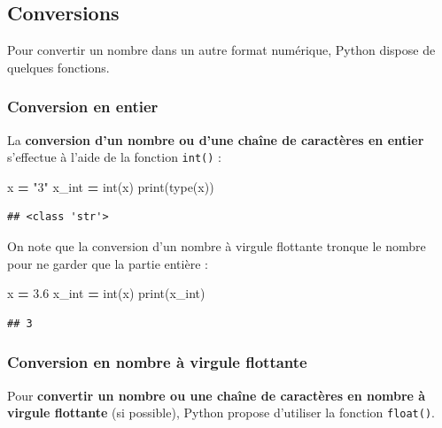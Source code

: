 \documentclass[12pt,]{book}
\newenvironment{Shaded}{\begin{snugshade}}{\end{snugshade}}
\newcommand{\FloatTok}[1]{\textcolor[rgb]{0.00,0.00,0.81}{#1}}
\newcommand{\StringTok}[1]{\textcolor[rgb]{0.31,0.60,0.02}{#1}}
\newcommand{\OperatorTok}[1]{\textcolor[rgb]{0.81,0.36,0.00}{\textbf{#1}}}
\newcommand{\BuiltInTok}[1]{#1}
\newcommand{\NormalTok}[1]{#1}
\numberwithin{equation}{section}
\numberwithin{countremarque}{section}
\begin{document}
\subsection{Conversions}\label{conversions}

Pour convertir un nombre dans un autre format numérique, Python dispose
de quelques fonctions.

\subsubsection{Conversion en entier}\label{conversion-en-entier}

La \textbf{conversion d'un nombre ou d'une chaîne de caractères en
entier} s'effectue à l'aide de la fonction \texttt{int()} :

\begin{Shaded}
\begin{Highlighting}[]
\NormalTok{x }\OperatorTok{=} \StringTok{"3"}
\NormalTok{x_int }\OperatorTok{=} \BuiltInTok{int}\NormalTok{(x)}
\BuiltInTok{print}\NormalTok{(}\BuiltInTok{type}\NormalTok{(x))}
\end{Highlighting}
\end{Shaded}

\begin{lstlisting}
## <class 'str'>
\end{lstlisting}

On note que la conversion d'un nombre à virgule flottante tronque le
nombre pour ne garder que la partie entière :

\begin{Shaded}
\begin{Highlighting}[]
\NormalTok{x }\OperatorTok{=} \FloatTok{3.6}
\NormalTok{x_int }\OperatorTok{=} \BuiltInTok{int}\NormalTok{(x)}
\BuiltInTok{print}\NormalTok{(x_int)}
\end{Highlighting}
\end{Shaded}

\begin{lstlisting}
## 3
\end{lstlisting}

\subsubsection{Conversion en nombre à virgule
flottante}\label{conversion-en-nombre-a-virgule-flottante}

Pour \textbf{convertir un nombre ou une chaîne de caractères en nombre à
virgule flottante} (si possible), Python propose d'utiliser la fonction
\texttt{float()}.
\end{document}
